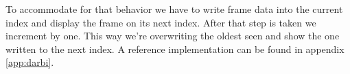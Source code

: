 To accommodate for that behavior we have to write frame data into the current 
index and display the frame on its next index. After that step is taken we 
increment by one. This way we’re overwriting the oldest seen 
 and show the one written to the next index. A reference 
implementation can be found in appendix \ref{app:darbi}.